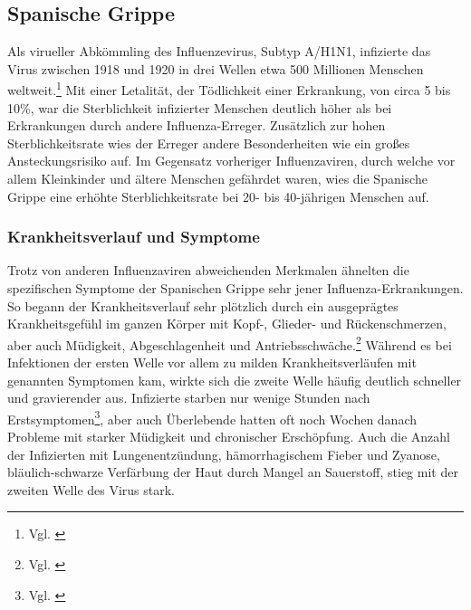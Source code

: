 \documentclass[12pt]{article}
\begin{document}
\subsection{Spanische Grippe}
Als virueller Abkömmling des Influenzevirus, Subtyp A/H1N1, infizierte das Virus zwischen 1918 und 1920 in drei Wellen etwa 500 Millionen Menschen weltweit.\footnote{Vgl. \cite{Span}} Mit einer Letalität, der Tödlichkeit einer Erkrankung, von circa 5 bis 10\%, war die Sterblichkeit infizierter Menschen deutlich höher als bei Erkrankungen durch andere Influenza-Erreger. Zusätzlich zur hohen Sterblichkeitsrate wies der Erreger andere Besonderheiten wie ein großes Ansteckungsrisiko auf. Im Gegensatz vorheriger Influenzaviren, durch welche vor allem Kleinkinder und ältere Menschen gefährdet waren, wies die Spanische Grippe eine erhöhte Sterblichkeitsrate bei 20- bis 40-jährigen Menschen auf. 

\subsubsection{Krankheitsverlauf und Symptome}
Trotz von anderen Influenzaviren abweichenden Merkmalen ähnelten die spezifischen Symptome der Spanischen Grippe sehr jener Influenza-Erkrankungen. So begann der Krankheitsverlauf sehr plötzlich durch ein ausgeprägtes Krankheitsgefühl im ganzen Körper mit Kopf-, Glieder- und Rückenschmerzen, aber auch Müdigkeit, Abgeschlagenheit und Antriebsschwäche.\footnote{Vgl. \cite{Span}} Während es bei Infektionen der ersten Welle vor allem zu milden Krankheitsverläufen mit genannten Symptomen kam, wirkte sich die zweite Welle häufig deutlich schneller und gravierender aus. Infizierte starben nur wenige Stunden nach Erstsymptomen\footnote{Vgl. \cite{Hanan2021}}, aber auch Überlebende hatten oft noch Wochen danach Probleme mit starker Müdigkeit und chronischer Erschöpfung. Auch die Anzahl der Infizierten mit Lungenentzündung, hämorrhagischem Fieber und Zyanose, bläulich-schwarze Verfärbung der Haut durch Mangel an Sauerstoff, stieg mit der zweiten Welle des Virus stark.
\end{document}
